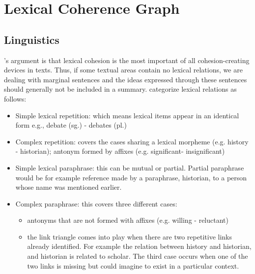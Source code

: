 \chapter{Lexical Coherence Graph}
\label{chapt:lexical_coherence_graph}


\section{Linguistics}
\label{linguistics}


's argument is that lexical cohesion is the most important of all cohesion-creating devices in texts. 
Thus, if some textual areas contain no lexical relations, we are dealing with marginal sentences and the ideas expressed through these sentences should generally not be included in a summary. 
 categorize lexical relations as follows:
\begin{itemize}
\item Simple lexical repetition: which means lexical items appear in an identical form e.g., debate (sg.) - debates (pl.)
\item Complex repetition: covers the cases sharing a lexical morpheme (e.g. history - historian); antonym formed by affixes (e.g. significant- insignificant)
\item Simple lexical paraphrase: this can be mutual or partial. 
Partial paraphrase would be for example reference made by a paraphrase, historian, to a person whose name was mentioned earlier. 
\item Complex paraphrase: this covers three different cases: 
\begin{itemize}
    \item antonyms that are not formed with affixes (e.g. willing - reluctant)
    \item the link triangle comes into play when there are two repetitive links already identified. 
    For example the relation between history and historian, and historian is related to scholar. 
    The third case occurs when one of the two links is missing but could imagine to exist in a particular context. 
\end{itemize} 
\end{itemize}

